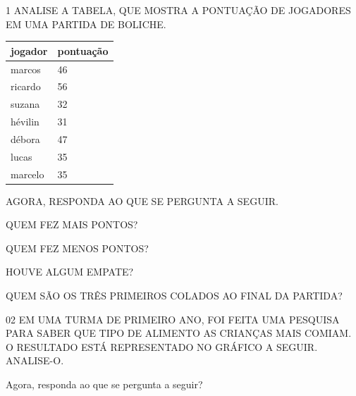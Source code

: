 
\num{1} ANALISE A TABELA, QUE MOSTRA A PONTUAÇÃO DE JOGADORES EM UMA PARTIDA DE
BOLICHE.


\begin{longtable}[]{@{}ll@{}}
\toprule
jogador & pontuação\tabularnewline
\midrule
\endhead
marcos & 46\tabularnewline
ricardo & 56\tabularnewline
suzana & 32\tabularnewline
hévilin & 31\tabularnewline
débora & 47\tabularnewline
lucas & 35\tabularnewline
marcelo & 35\tabularnewline
\bottomrule
\end{longtable}

AGORA, RESPONDA AO QUE SE PERGUNTA A SEGUIR.

\begin{escolha}
\item QUEM FEZ MAIS PONTOS?


\item QUEM FEZ MENOS PONTOS?


\item HOUVE ALGUM EMPATE?


\item QUEM SÃO OS TRÊS PRIMEIROS COLADOS AO FINAL DA PARTIDA?

\end{escolha}

\num{02} EM UMA TURMA DE PRIMEIRO ANO, FOI FEITA UMA PESQUISA PARA SABER QUE TIPO DE ALIMENTO AS
CRIANÇAS MAIS COMIAM. O RESULTADO ESTÁ REPRESENTADO NO GRÁFICO A SEGUIR. ANALISE-O.


Agora, responda ao que se pergunta a seguir?


